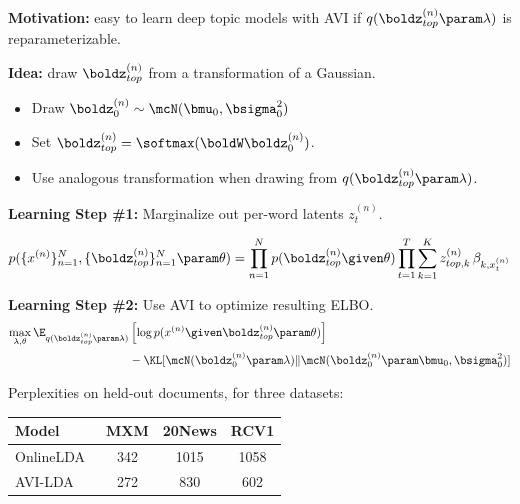 \begin{frame}
\textbf{Motivation:} easy to learn deep topic models with AVI if $q(\boldz^{(n)}_{top} \param \lambda)$ is reparameterizable.

\air
\air
\air
\textbf{Idea:} draw $\boldz^{(n)}_{top}$ from a transformation of a Gaussian.
\begin{itemize}
    \item Draw $\boldz^{(n)}_0 \sim \mcN(\bmu_0, \bsigma^2_0)$
    \item Set $\boldz^{(n)}_{top} = \softmax(\boldW \boldz^{(n)}_0)$. %
    \item Use analogous transformation when drawing from $q(\boldz^{(n)}_{top} \param \lambda)$.
    
\end{itemize}
    
\end{frame}


\begin{frame}
\textbf{Learning Step \#1:} Marginalize out per-word latents $z^{(n)}_t$. 

\begin{align*}
    p(\{x^{(n)}\}_{n=1}^N, \{\boldz^{(n)}_{top}\}_{n=1}^N \param \theta) = \prod_{n=1}^N p(\boldz^{(n)}_{top} \given \theta) \prod_{t=1}^T \sum_{k=1}^K z^{(n)}_{top, k} \, \beta_{k, x^{(n)}_t}
\end{align*}

\air
\air
\textbf{Learning Step \#2:} Use AVI to optimize resulting ELBO.
\begin{align*}
    \max_{\lambda, \theta} \E_{q(\boldz^{(n)}_{top} \param \lambda)} &\left[\log p(x^{(n)} \given \boldz^{(n)}_{top}  \param \theta) \right] \\
    &- \KL[ \mcN(\boldz^{(n)}_0 \param \lambda) \Vert \mcN(\boldz^{(n)}_0 \param \bmu_0, \bsigma_0^2)]
\end{align*}
\end{frame}


\begin{frame}
Perplexities on held-out documents, for three datasets:

\begin{table}
\begin{tabular}{lccc}
\toprule
     Model & MXM & 20News & RCV1 \\
\midrule     
     OnlineLDA~\citep{hoffman2010online} & 342 & 1015 & 1058 \\
     AVI-LDA~\citep{miao2017nvi} & 272 & 830 & 602 \\
\bottomrule
\end{tabular}
\end{table}
\end{frame}